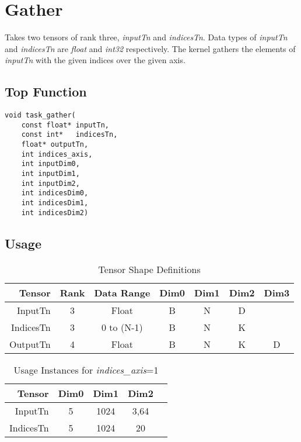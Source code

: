 \documentclass[•]{article}
\begin{document}
\clearpage








\section{Gather}
Takes two tensors of rank three, \emph{inputTn} and \emph{indicesTn}. Data types of \emph{inputTn} and \emph{indicesTn} are \emph{float} and \emph{int32} respectively. The kernel gathers the elements of \emph{inputTn} with the given indices over the given axis.

\subsection{Top Function}
\begin{lstlisting}
void task_gather(
	const float* inputTn,
	const int*   indicesTn,
	float* outputTn,
	int indices_axis,
	int inputDim0,
	int inputDim1,
	int inputDim2,
	int indicesDim0,
	int indicesDim1,
	int indicesDim2)
\end{lstlisting}

\subsection{Usage}
\begin{table}[htbp] %
\caption{Tensor Shape Definitions}
\label{tab:shapes_concat}
	\begin{center}
		\begin{tabular}{|r|c|c|c|c|c|c|} 
		\hline	
		Tensor & Rank & Data Range & Dim0 & Dim1 & Dim2 & Dim3\\ 
		\hline	
		InputTn &
			3 &
			Float &
			B &
			N &
			D &
			\\ 
		\hline	
		IndicesTn &
			3 &
			0 to (N-1) &
			B &
			N &
			K &
			\\ 
		\hline
		OutputTn &
			4 &
			Float &
			B & 
			N & 
			K &
			D \\
		\hline
		\end{tabular}
	\end{center}
\end{table}

\begin{table}[htbp] %
\caption{Usage Instances for \emph{indices\_axis}=1}
\label{tab:shapes_concat}
	\begin{center}
		\begin{tabular}{|r|c|c|c|c|} 
		\hline	
		Tensor & Dim0 & Dim1 & Dim2\\ 
		\hline	
		InputTn &
			5 &
			1024 &
			3,64
			\\ 
		\hline	
		IndicesTn &
			5 &
			1024 &
			20 
			\\ 
		\hline
		\end{tabular}
	\end{center}
\end{table}
\end{document}
